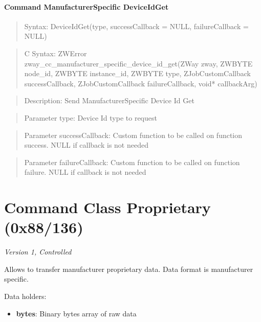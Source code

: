 \paragraph{Command ManufacturerSpecific DeviceIdGet}
\begin{quote}Syntax: DeviceIdGet(type, successCallback = NULL, failureCallback = NULL)\end{quote}
\begin{quote}C Syntax: ZWError zway\_cc\_manufacturer\_specific\_device\_id\_get(ZWay zway, ZWBYTE node\_id, ZWBYTE instance\_id, ZWBYTE type, ZJobCustomCallback successCallback, ZJobCustomCallback failureCallback, void* callbackArg)\end{quote}
\begin{quote}Description: Send ManufacturerSpecific Device Id Get\end{quote}
\begin{quote}Parameter type: Device Id type to request\end{quote}
\begin{quote}Parameter successCallback: Custom function to be called on function success. NULL if callback is not needed\end{quote}
\begin{quote}Parameter failureCallback: Custom function to be called on function failure. NULL if callback is not needed\end{quote}



\section{Command Class Proprietary (0x88/136)}

\textit{Version 1, Controlled}
\newline

Allows to transfer manufacturer proprietary data. Data format is manufacturer specific.
\newline

\noindent
Data holders:

\begin{itemize}
\item \textbf{bytes}: Binary bytes array of raw data
\end{itemize}

